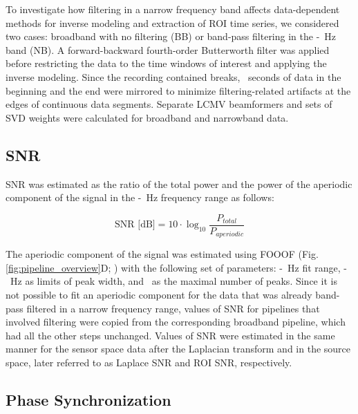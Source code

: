 \medskip

To investigate how filtering in a narrow frequency band affects data-dependent methods for inverse modeling and extraction of ROI time series, we considered two cases: broadband with no filtering (BB) or band-pass filtering in the \muLow-\muHigh~Hz band (NB). A forward-backward fourth-order Butterworth filter was applied before restricting the data to the time windows of interest and applying the inverse modeling. Since the recording contained breaks, \mirrorSeconds~seconds of data in the beginning and the end were mirrored to minimize filtering-related artifacts at the edges of continuous data segments. Separate LCMV beamformers and sets of SVD weights were calculated for broadband and narrowband data.

\subsection{SNR}

SNR was estimated as the ratio of the total power and the power of the aperiodic component of the signal in the \muLow-\muHigh~Hz frequency range as follows:

\begin{equation}
    \text{SNR [dB]} = 10 \cdot \log_{10} \frac{P_{total}}{P_{aperiodic}}
\end{equation}

The aperiodic component of the signal was estimated using FOOOF (Fig. \ref{fig:pipeline_overview}D; \cite{FOOOF_Donoghue2020}) with the following set of parameters: \fooofFitRangeLow-\fooofFitRangeHigh~Hz fit range, \fooofPeakWidthMin-\fooofPeakWidthMax~Hz as limits of peak width, and \fooofNumPeaksMax~as the maximal number of peaks. Since it is not possible to fit an aperiodic component for the data that was already band-pass filtered in a narrow frequency range, values of SNR for pipelines that involved filtering were copied from the corresponding broadband pipeline, which had all the other steps unchanged. Values of SNR were estimated in the same manner for the sensor space data after the Laplacian transform and in the source space, later referred to as Laplace SNR and ROI SNR, respectively.

\subsection{Phase Synchronization}

